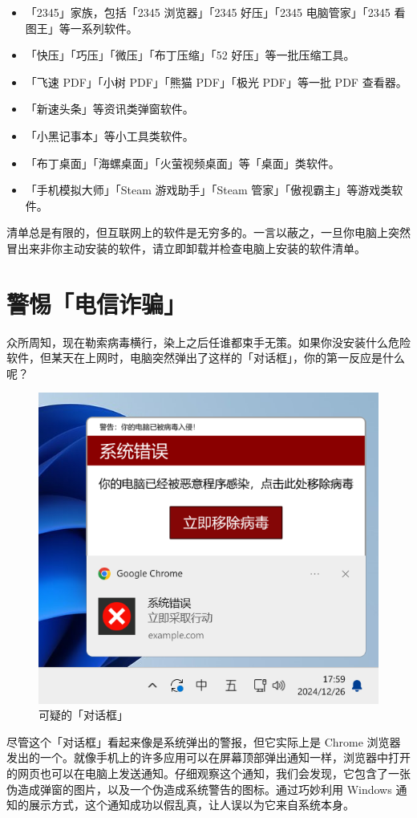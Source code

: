 \begin{itemize}
  \item 「2345」家族，包括「2345 浏览器」「2345 好压」「2345 电脑管家」「2345 看图王」等一系列软件。
  \item 「快压」「巧压」「微压」「布丁压缩」「52 好压」等一批压缩工具。
  \item 「飞速 PDF」「小树 PDF」「熊猫 PDF」「极光 PDF」等一批 PDF 查看器。
  \item 「新速头条」等资讯类弹窗软件。
  \item 「小黑记事本」等小工具类软件。
  \item 「布丁桌面」「海螺桌面」「火萤视频桌面」等「桌面」类软件。
  \item 「手机模拟大师」「Steam 游戏助手」「Steam 管家」「傲视霸主」等游戏类软件。
\end{itemize}

清单总是有限的，但互联网上的软件是无穷多的。一言以蔽之，一旦你电脑上突然冒出来非你主动安装的软件，请立即卸载并检查电脑上安装的软件清单。

\section{警惕「电信诈骗」}

众所周知，现在勒索病毒横行，染上之后任谁都束手无策。如果你没安装什么危险软件，但某天在上网时，电脑突然弹出了这样的「对话框」，你的第一反应是什么呢？

\begin{figure}[htb!]
  \centering
  \includegraphics[width=.5\textwidth]{assets/basic/Fake_anti_virus_notification.png}
  \caption{可疑的「对话框」}
  \label{fig:Fake_anti_virus_notification}
\end{figure}

尽管这个「对话框」看起来像是系统弹出的警报，但它实际上是 Chrome 浏览器发出的一个。就像手机上的许多应用可以在屏幕顶部弹出通知一样，浏览器中打开的网页也可以在电脑上发送通知。仔细观察这个通知，我们会发现，它包含了一张伪造成弹窗的图片，以及一个伪造成系统警告的图标。通过巧妙利用 Windows 通知的展示方式，这个通知成功以假乱真，让人误以为它来自系统本身。

